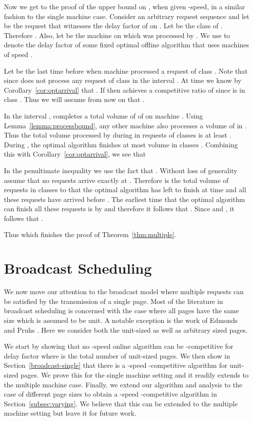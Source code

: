 \documentclass[11pt]{article}
\newcommand{\lemref}[1]{Lemma~\ref{lemma:#1}}
\newcommand{\corref}[1]{Corollary~\ref{cor:#1}}
\begin{document}
Now we get to the proof of the upper bound on \mmug, when given -speed, in a similar fashion to the single machine
case. Consider an arbitrary request sequence  and let  be
the request that witnesses the delay factor  of  on .
Let  be the class of . Therefore .
Also, let  be the machine on which  was processed by .
We use  to denote the delay factor of some fixed optimal
offline algorithm that uses  machines of speed .

Let  be the last time before  when machine  processed a request
of class . Note that  since  does not process any
request of class  in the interval . At time  we
know by \corref{optarrival} that . If  then 
achieves a competitive ratio of  since  is in class
. Thus we will assume from now on that .

In the interval ,  completes a total volume of of
 on machine . Using \lemref{processbound}, any
other machine  also processes a volume of  in . Thus the total volume processed by  during 
in requests of classes  is at least .  During , the optimal algorithm finishes at most
 volume in classes .  Combining this with
\corref{optarrival}, we see that

In the penultimate inequality we use the fact that . Without loss of generality assume that no
requests arrive exactly at . Therefore  is the
total volume of requests in classes  to  that the optimal
algorithm has left to finish at time  and all these requests have
arrived before . The earliest time that the optimal algorithm can
finish all these requests is by  and therefore it
follows that . Since  and , it follows that .

Thus  which finishes the proof
of Theorem~\ref{thm:multiple}.

\section{Broadcast Scheduling}
\label{sec:broadcast} We now move our attention to the broadcast
model where multiple requests can be satisfied by the transmission
of a single page.
Most of the literature in broadcast scheduling is concerned with the
case where all pages have the same size which is assumed to be unit. A
notable exception is the work of Edmonds and Pruhs
\cite{EdmondsP03}. Here we consider both the unit-sized as well as
arbitrary sized pages.

We start by showing that no -speed online algorithm can be -competitive for delay factor
where  is the total number of unit-sized pages. We then show in
Section~\ref{broadcast-single} that there is a -speed
-competitive algorithm for unit-sized pages. We prove
this for the single machine setting and it readily extends to the
multiple machine case. Finally,  we extend our algorithm and analysis to
the case of different page sizes to obtain a -speed
-competitive algorithm in Section~\ref{subsec:varying}.
We believe that this can be extended to the multiple machine setting
but leave it for future work.
\end{document}
